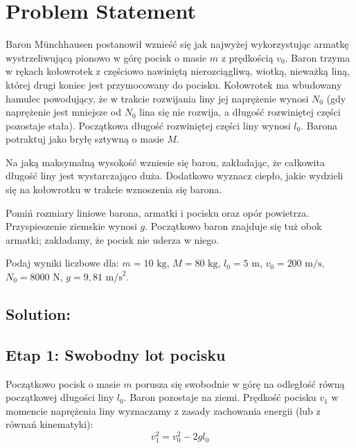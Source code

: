 \documentclass[a4paper,12pt]{article}
\begin{document}
\fontsize{15}{18}\selectfont

\section*{Problem Statement}

Baron Münchhausen postanowił wznieść się jak najwyżej wykorzystując armatkę wystrzeliwującą pionowo w górę pocisk o masie $m$ z prędkością $v_0$. Baron trzyma w rękach kołowrotek z częściowo nawiniętą nierozciągliwą, wiotką, nieważką liną, której drugi koniec jest przymocowany do pocisku. Kołowrotek ma wbudowany hamulec powodujący, że w trakcie rozwijania liny jej naprężenie wynosi $N_0$ (gdy naprężenie jest mniejsze od $N_0$ lina się nie rozwija, a długość rozwiniętej części pozostaje stała). Początkowa długość rozwiniętej części liny wynosi $l_0$. Barona potraktuj jako bryłę sztywną o masie $M$.

Na jaką maksymalną wysokość wzniesie się baron, zakładając, że całkowita długość liny jest wystarczająco duża. Dodatkowo wyznacz ciepło, jakie wydzieli się na kołowrotku w trakcie wznoszenia się barona.

Pomiń rozmiary liniowe barona, armatki i pocisku oraz opór powietrza. Przyspieszenie ziemskie wynosi $g$. Początkowo baron znajduje się tuż obok armatki; zakładamy, że pocisk nie uderza w niego.

Podaj wyniki liczbowe dla:
$m = 10 \text{ kg}$, $M = 80 \text{ kg}$, $l_0 = 5 \text{ m}$, $v_0 = 200 \text{ m/s}$, $N_0 = 8000 \text{ N}$, $g = 9,81 \text{ m/s}^2$.

\bigskip

\subsection*{Solution:}

\subsection*{Etap 1: Swobodny lot pocisku}
Początkowo pocisk o masie $m$ porusza się swobodnie w górę na odległość równą początkowej długości liny $l_0$. Baron pozostaje na ziemi. Prędkość pocisku $v_1$ w momencie naprężenia liny wyznaczamy z zasady zachowania energii (lub z równań kinematyki):
\begin{equation}
v_1^2 = v_0^2 - 2gl_0
\end{equation}
\end{document}
